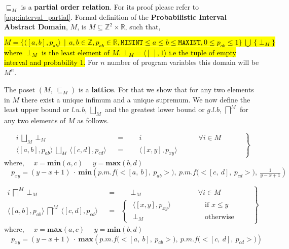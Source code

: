 \documentclass[final,3p, review, times]{util/elsarticle}
\begin{document}
$\sqsubseteq_M$ is a \textbf{partial order relation}. For its proof please refer to \ref{app:interval_partial}. Formal definition of the \textbf{Probabilistic Interval Abstract Domain}, $M$, is $M\subseteq \mathbb{Z}^2\times\mathbb{R}$, such that,

\hl{$M=\big\{\langle[a,b],p_{ab}\rangle\ \ |\ \ a,b\in\mathbb{Z}, p_{ab}\in\mathbb{R}, \mathtt{MININT}\leq a\leq b\leq\mathtt{MAXINT}, 0\leq p_{ab}\leq1\big\}\ \bigcup\ \big\{\perp_M\big\}$\\
where $\perp_M$ is the least element of $M$. $\bot_M=\langle[\ ],1\rangle$ i.e the tuple of empty interval and probability 1.} For $n$ number of program variables this domain will be $M^n$.

The poset $(M,\ \sqsubseteq_M)$ is a \textbf{lattice}. For that we show that for any two elements in $M$ there exist a unique infimum and a unique supremum. We now define the least upper bound or $l.u.b$, $\displaystyle\bigsqcup_M$ and the greatest lower bound or $g.l.b$, $\displaystyle\bigsqcap^M$ for any two elements of $M$ as follows.

\begin{equation}
\label{eq:lub_M}
 \left.\begin{aligned}
        i\ \bigsqcup_M\ \bot_M&&=&\quad\ \ i\qquad\qquad\qquad\qquad\text{$\forall i\in M$}\\
        \langle[a,b],p_{ab}\rangle\ \bigsqcup_M\ \langle[c,d],p_{cd}\rangle&&=&\quad\ \ \langle[x,y],p_{xy}\rangle\qquad\quad\qquad\qquad
       \end{aligned}\qquad
 \right\}
\end{equation}
where,
	$\quad x=\mathbf{min}(a,c)$
	$\quad y=\mathbf{max}(b,d)$
	$\quad\displaystyle p_{xy}=(y-x+1)\ \cdot\ \mathbf{min}\left(p.m.f\Big(\big<[a,\ b],\ p_{ab}\big>\Big),\ p.m.f\Big(\big<[c,\ d],\ p_{cd}\big>\Big),\ \frac{1}{y-x+1}\right)$
	
\begin{equation}
\label{eq:glb_M}
 \left.\begin{aligned}
        i\ \bigsqcap^M\ \bot_M&&=&\quad\ \ \bot_M\qquad\qquad\qquad\qquad\text{$\forall i\in M$}&\\
        \langle[a,b],p_{ab}\rangle\ \bigsqcap^M\ \langle[c,d],p_{cd}\rangle&&=&\begin{cases} 
   			  \ \ \langle[x,y],p_{xy}\rangle&\qquad\qquad\text{if }x\leq y\\
   			  \ \ \bot_M&\qquad\qquad\text{otherwise}
  			\end{cases}
       \end{aligned}\quad
 \right\}
\end{equation}
where,
	$\quad x=\mathbf{max}(a,c)$
	$\quad y=\mathbf{min}(b,d)$
	$\quad\displaystyle p_{xy}=(y-x+1)\ \cdot\ \mathbf{max}\left(p.m.f\Big(\big<[a,\ b],\ p_{ab}\big>\Big),\ p.m.f\Big(\big<[c,\ d],\ p_{cd}\big>\Big)\right)$
\end{document}
